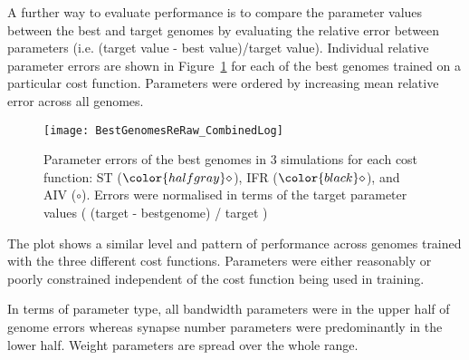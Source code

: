A further way to evaluate {\GA} performance is to compare the parameter values
between the best and target genomes by evaluating the relative error
between parameters (i.e. (target value - best value)/target value). Individual 
relative parameter errors are shown in Figure~\ref{fig:GA:R2} for
each of the best genomes trained on a particular cost function. Parameters
were ordered by increasing mean relative error across all genomes.

\smallskip{}

\begin{figure}[th!]
  \centering
  \texttt{[image: BestGenomesReRaw\_CombinedLog]}
  \caption{Parameter errors of the best genomes in 3 {\GA}
    simulations for each cost function: ST (${\color{halfgray} \diamond }$), IFR (${\color{black} \diamond }$), and AIV (${\circ}$). Errors were normalised in terms
    of the target parameter values ( (target - bestgenome) / target )}\label{fig:GA:R2}
\end{figure}


The plot shows a similar level and pattern of performance across
genomes trained with the three different cost functions. Parameters were
either reasonably or poorly constrained independent of the cost function
being used in training.

\smallskip{}

In terms of parameter type, all bandwidth parameters were in the upper half
of genome errors whereas synapse number parameters were predominantly in
the lower half.  Weight parameters are spread over the whole range.


% 



